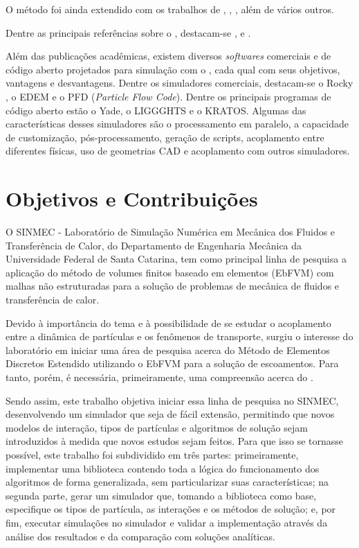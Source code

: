 O método foi ainda extendido com os trabalhos de , , , além de vários outros.

Dentre as principais referências sobre o \DEM{}, destacam-se ,  e .

Além das publicações acadêmicas, existem diversos \textit{softwares} comerciais e de código aberto projetados para simulação com o \DEM{}, cada qual com seus objetivos, vantagens e desvantagens. Dentre os simuladores comerciais, destacam-se o Rocky \DEM{}, o EDEM e o PFD (\textit{Particle Flow Code}). Dentre os principais programas de código aberto estão o Yade, o LIGGGHTS e o KRATOS. Algumas das características desses simuladores são o processamento em paralelo, a capacidade de customização, pós-processamento, geração de scripts, acoplamento entre diferentes físicas, uso de geometrias CAD e acoplamento com outros simuladores.

\section{Objetivos e Contribuições}

O SINMEC - Laboratório de Simulação Numérica em Mecânica dos Fluidos e Transferência de Calor, do Departamento de Engenharia Mecânica da Universidade Federal de Santa Catarina, tem como principal linha de pesquisa a aplicação do método de volumes finitos baseado em elementos (EbFVM) com malhas não estruturadas para a solução de problemas de mecânica de fluidos e transferência de calor.

Devido à importância do tema e à possibilidade de se estudar o acoplamento entre a dinâmica de partículas e os fenômenos de transporte, surgiu o interesse do laboratório em iniciar uma área de pesquisa acerca do Método de Elementos Discretos Estendido utilizando o EbFVM para a solução de escoamentos. Para tanto, porém, é necessária, primeiramente, uma compreensão acerca do \DEM{}.

Sendo assim, este trabalho objetiva iniciar essa linha de pesquisa no SINMEC, desenvolvendo um simulador que seja de fácil extensão, permitindo que novos modelos de interação, tipos de partículas e algoritmos de solução sejam introduzidos à medida que novos estudos sejam feitos. Para que isso se tornasse possível, este trabalho foi subdividido em três partes: primeiramente, implementar uma biblioteca contendo toda a lógica do funcionamento dos algoritmos \DEM{} de forma generalizada, sem particularizar suas características; na segunda parte, gerar um simulador que, tomando a biblioteca como base, especifique os tipos de partícula, as interações e os métodos de solução; e, por fim, executar simulações no simulador e validar a implementação através da análise dos resultados e da comparação com soluções analíticas. 
 
